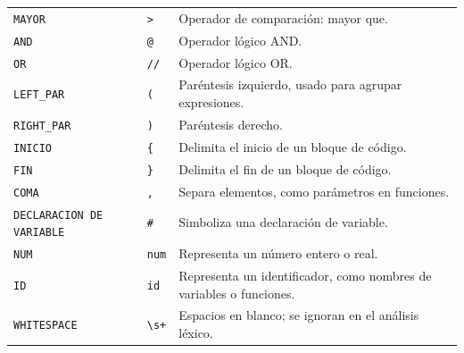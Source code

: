 \documentclass[12pt]{article}
\begin{document}
\begin{center}
\begin{tabular}{|l|l|p{7cm}|}
\texttt{MAYOR} & \verb|>| & Operador de comparación: mayor que. \\
\texttt{AND} & \verb|@| & Operador lógico AND. \\
\texttt{OR} & \verb|//| & Operador lógico OR. \\
\texttt{LEFT\_PAR} & \verb|(| & Paréntesis izquierdo, usado para agrupar expresiones. \\
\texttt{RIGHT\_PAR} & \verb|)| & Paréntesis derecho. \\
\texttt{INICIO} & \verb|{| & Delimita el inicio de un bloque de código. \\
\texttt{FIN} & \verb|}| & Delimita el fin de un bloque de código. \\
\texttt{COMA} & \verb|,| & Separa elementos, como parámetros en funciones. \\
\texttt{DECLARACION DE VARIABLE} & \verb|#| & Simboliza una declaración de variable. \\
\texttt{NUM} & \verb|num| & Representa un número entero o real. \\
\texttt{ID} & \verb|id| & Representa un identificador, como nombres de variables o funciones. \\
\texttt{WHITESPACE} & \verb|\s+| & Espacios en blanco; se ignoran en el análisis léxico. \\
\hline
\end{tabular}
\end{center}
\end{document}
